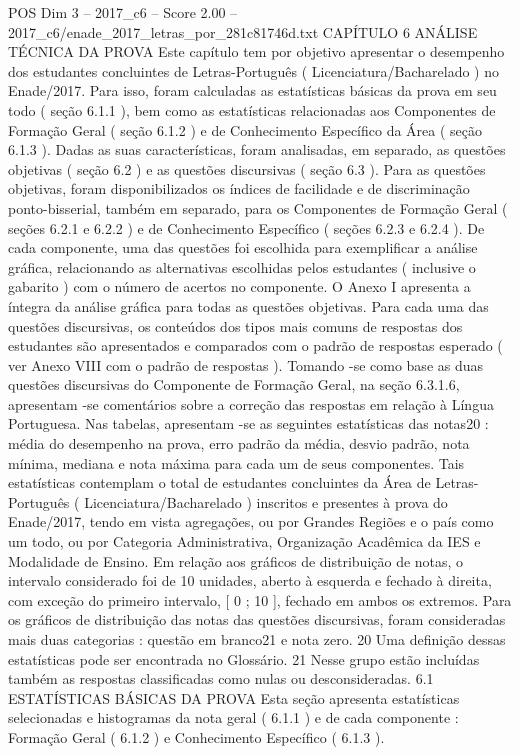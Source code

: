 \begin{textsample}{POS Dim 3 – 2017\_c6 – Score 2.00 – 2017\_c6/enade\_2017\_letras\_por\_281c81746d.txt}  \label{ex:f3_pos_194}
CAPÍTULO 6 ANÁLISE TÉCNICA DA PROVA Este capítulo tem por objetivo apresentar o desempenho dos estudantes concluintes de Letras-Português ( Licenciatura/Bacharelado ) no Enade/2017.
Para isso, foram calculadas as estatísticas básicas da prova em seu todo ( seção 6.1.1 ), bem como as estatísticas relacionadas aos Componentes de Formação Geral ( seção 6.1.2 ) e de Conhecimento Específico da Área ( seção 6.1.3 ).
Dadas as suas características, foram analisadas, em separado, as questões objetivas ( seção 6.2 ) e as questões discursivas ( seção 6.3 ).
Para as questões objetivas, foram disponibilizados os índices de facilidade e de discriminação ponto-bisserial, também em separado, para os Componentes de Formação Geral ( seções 6.2.1 e 6.2.2 ) e de Conhecimento Específico ( seções 6.2.3 e 6.2.4 ).
De cada componente, uma das questões foi escolhida para exemplificar a análise gráfica, relacionando as alternativas escolhidas pelos estudantes ( inclusive o gabarito ) com o número de acertos no componente.
O Anexo I apresenta a íntegra da análise gráfica para todas as questões objetivas.
Para cada uma das questões discursivas, os conteúdos dos tipos mais comuns de respostas dos estudantes são apresentados e comparados com o padrão de respostas esperado ( ver Anexo VIII com o padrão de respostas ).
Tomando -se como base as duas questões discursivas do Componente de Formação Geral, na seção 6.3.1.6, apresentam -se comentários sobre a correção das respostas em relação à Língua Portuguesa.
Nas tabelas, apresentam -se as seguintes estatísticas das notas20 : média do desempenho na prova, erro padrão da média, desvio padrão, nota mínima, mediana e nota máxima para cada um de seus componentes.
Tais estatísticas contemplam o total de estudantes concluintes da Área de Letras-Português ( Licenciatura/Bacharelado ) inscritos e presentes à prova do Enade/2017, tendo em vista agregações, ou por Grandes Regiões e o país como um todo, ou por Categoria Administrativa, Organização Acadêmica da IES e Modalidade de Ensino.
Em relação aos gráficos de distribuição de notas, o intervalo considerado foi de 10 unidades, aberto à esquerda e fechado à direita, com exceção do primeiro intervalo, [ 0 ; 10 ], fechado em ambos os extremos.
Para os gráficos de distribuição das notas das questões discursivas, foram consideradas mais duas categorias : questão em branco21 e nota zero. 20 Uma definição dessas estatísticas pode ser encontrada no Glossário. 21 Nesse grupo estão incluídas também as respostas classificadas como nulas ou desconsideradas. 6.1 ESTATÍSTICAS BÁSICAS DA PROVA Esta seção apresenta estatísticas selecionadas e histogramas da nota geral ( 6.1.1 ) e de cada componente : Formação Geral ( 6.1.2 ) e Conhecimento Específico ( 6.1.3 ).

\end{textsample}
